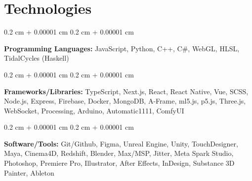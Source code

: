 \documentclass[10pt, letterpaper]{article}
\newenvironment{onecolentry}{
    \begin{adjustwidth}{
        0.2 cm + 0.00001 cm
    }{
        0.2 cm + 0.00001 cm
    }
}{
    \end{adjustwidth}
} %
\begin{document}
    \section{Technologies}

    \begin{onecolentry}
        \textbf{Programming Languages:} JavaScript, Python, C++, C\#, WebGL, HLSL, TidalCycles (Haskell)
    \end{onecolentry}

    \vspace{0.2 cm}

    \begin{onecolentry}
        \textbf{Frameworks/Libraries:} TypeScript, Next.js, React, React Native, Vue, SCSS, Node.js, Express, Firebase, Docker, MongoDB, A-Frame, ml5.js, p5.js, Three.js, WebSocket, Processing, Arduino, Automatic1111, ComfyUI
    \end{onecolentry}

    \vspace{0.2 cm}

    \begin{onecolentry}
        \textbf{Software/Tools:} Git/Github, Figma, Unreal Engine, Unity, TouchDesigner, Maya, Cinema4D, Redshift, Blender, Max/MSP, Jitter, Meta Spark Studio, Photoshop, Premiere Pro, Illustrator, After Effects, InDesign, Substance 3D Painter, Ableton
    \end{onecolentry}
\end{document}

